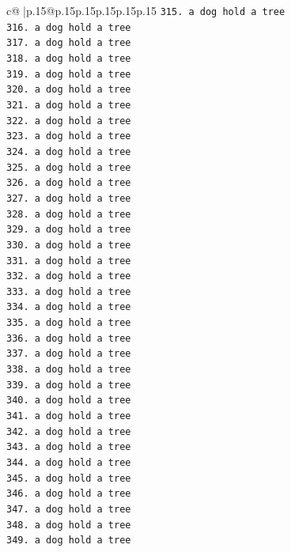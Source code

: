 \documentclass{article}
\begin{document}
{\begin{supertabular}{c@{$\;$}|p{.15\linewidth}@{}p{.15\linewidth}p{.15\linewidth}p{.15\linewidth}p{.15\linewidth}p{.15\linewidth}}
{{{\texttt{315. a dog hold a tree} \\
\texttt{316. a dog hold a tree} \\
\texttt{317. a dog hold a tree} \\
\texttt{318. a dog hold a tree} \\
\texttt{319. a dog hold a tree} \\
\texttt{320. a dog hold a tree} \\
\texttt{321. a dog hold a tree} \\
\texttt{322. a dog hold a tree} \\
\texttt{323. a dog hold a tree} \\
\texttt{324. a dog hold a tree} \\
\texttt{325. a dog hold a tree} \\
\texttt{326. a dog hold a tree} \\
\texttt{327. a dog hold a tree} \\
\texttt{328. a dog hold a tree} \\
\texttt{329. a dog hold a tree} \\
\texttt{330. a dog hold a tree} \\
\texttt{331. a dog hold a tree} \\
\texttt{332. a dog hold a tree} \\
\texttt{333. a dog hold a tree} \\
\texttt{334. a dog hold a tree} \\
\texttt{335. a dog hold a tree} \\
\texttt{336. a dog hold a tree} \\
\texttt{337. a dog hold a tree} \\
\texttt{338. a dog hold a tree} \\
\texttt{339. a dog hold a tree} \\
\texttt{340. a dog hold a tree} \\
\texttt{341. a dog hold a tree} \\
\texttt{342. a dog hold a tree} \\
\texttt{343. a dog hold a tree} \\
\texttt{344. a dog hold a tree} \\
\texttt{345. a dog hold a tree} \\
\texttt{346. a dog hold a tree} \\
\texttt{347. a dog hold a tree} \\
\texttt{348. a dog hold a tree} \\
\texttt{349. a dog hold a tree} \\
}}}
\end{supertabular}}
\end{document}
